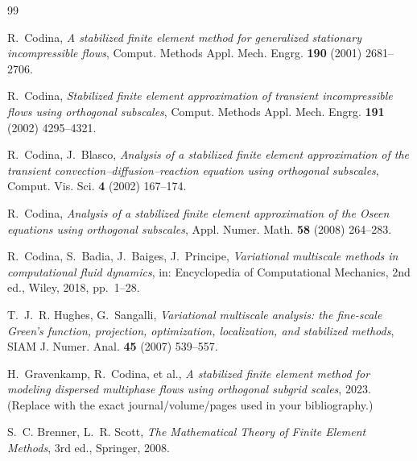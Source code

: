 \documentclass[11pt]{article}
\theoremstyle{plain}
\theoremstyle{remark}
\begin{document}
\begin{thebibliography}{99}
\itemsep2pt

R.~Codina,
\emph{A stabilized finite element method for generalized stationary
incompressible flows},
Comput. Methods Appl. Mech. Engrg. \textbf{190} (2001) 2681--2706.

R.~Codina,
\emph{Stabilized finite element approximation of transient incompressible flows
using orthogonal subscales},
Comput. Methods Appl. Mech. Engrg. \textbf{191} (2002) 4295--4321.

R.~Codina, J.~Blasco,
\emph{Analysis of a stabilized finite element approximation of the transient
convection--diffusion--reaction equation using orthogonal subscales},
Comput. Vis. Sci. \textbf{4} (2002) 167--174.

R.~Codina,
\emph{Analysis of a stabilized finite element approximation of the Oseen equations
using orthogonal subscales},
Appl. Numer. Math. \textbf{58} (2008) 264--283.

R.~Codina, S.~Badia, J.~Baiges, J.~Principe,
\emph{Variational multiscale methods in computational fluid dynamics},
in: Encyclopedia of Computational Mechanics, 2nd ed., Wiley, 2018, pp.~1--28.

T.~J.~R. Hughes, G.~Sangalli,
\emph{Variational multiscale analysis: the fine-scale Green's function,
projection, optimization, localization, and stabilized methods},
SIAM J. Numer. Anal. \textbf{45} (2007) 539--557.

H.~Gravenkamp, R.~Codina, et al.,
\emph{A stabilized finite element method for modeling dispersed multiphase flows
using orthogonal subgrid scales},
2023. (Replace with the exact journal/volume/pages used in your bibliography.)

S.~C. Brenner, L.~R. Scott,
\emph{The Mathematical Theory of Finite Element Methods},
3rd ed., Springer, 2008.

\end{thebibliography}
\end{document}
